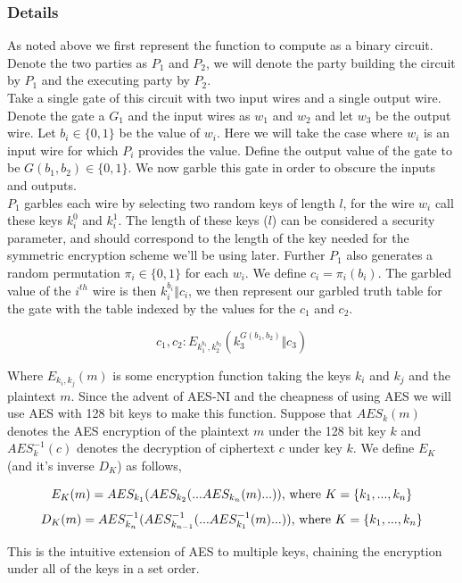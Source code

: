 \documentclass[a4paper,11pt]{article}
\begin{document}
			\subsubsection{Details} \label{Yao_Details}
				As noted above we first represent the function to compute as a binary circuit. Denote the two parties as $P_1$ and $P_2$, we will denote the party building the circuit by $P_1$ and the executing party by $P_2$.\\
				
				Take a single gate of this circuit with two input wires and a single output wire. Denote the gate a $G_1$ and the input wires as $w_1$ and $w_2$ and let $w_3$ be the output wire. Let $b_i \in \{0, 1\}$ be the value of $w_i$. Here we will take the case where $w_i$ is an input wire for which $P_i$ provides the value. Define the output value of the gate to be $G(b_1, b_2) \in \{0, 1\}$. We now garble this gate in order to obscure the inputs and outputs.\\

				$P_1$ garbles each wire by selecting two random keys of length $l$, for the wire $w_i$ call these keys $k_i^0$ and $k_i^1$. The length of these keys ($l$) can be considered a security parameter, and should correspond to the length of the key needed for the symmetric encryption scheme we'll be using later. Further $P_1$ also generates a random permutation $\pi_i \in \{0, 1\}$ for each $w_i$. We define $c_i = \pi_i(b_i)$. The garbled value of the $i^{th}$ wire is then $k_i^{b_i} \Vert c_i$, we then represent our garbled truth table for the gate with the table indexed by the values for the $c_1$ and $c_2$.

				$$ c_1, c_2 : E_{k_1^{b_1}, k_2^{b_2}} (k_3^{ G(b_1, b_2) } \Vert c_3) $$

				Where $E_{k_i, k_j}(m)$ is some encryption function taking the keys $k_i$ and $k_j$ and the plaintext $m$. Since the advent of AES-NI and the cheapness of using AES we will use AES with 128 bit keys to make this function. Suppose that $AES_k(m)$ denotes the AES encryption of the plaintext $m$ under the 128 bit key $k$ and $AES^{-1}_k(c)$ denotes the decryption of ciphertext $c$ under key $k$. We define $E_K$ (and it's inverse $D_K$) as follows,

				$$ E_K(m) = AES_{k_1}( AES_{k_2}( ...AES_{k_n}(m) ...) ) \textnormal{, where } K = \{k_1, ..., k_n\}$$ 
				$$ D_K(m) = AES^{-1}_{k_n}( AES^{-1}_{k_{n-1}}( ...AES^{-1}_{k_1}(m) ...) ) \textnormal{, where } K = \{k_1, ..., k_n\}$$ 

				This is the intuitive extension of AES to multiple keys, chaining the encryption under all of the keys in a set order.\\
\end{document}
